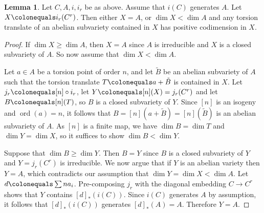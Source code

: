 \documentclass[reqno,10pt]{amsart}
\theoremstyle{definition}
\theoremstyle{definition}
\newtheorem{lem}[thm]{Lemma}
\DeclareMathOperator{\ord}{ord}
\begin{document}
\begin{lem}\label{lem:curvesinJacobians} Let $C,A,i,i_r$ be as above. Assume that $i(C)$ generates $A$. Let $X \colonequals i_r(C^r)$. Then either $X = A$, or $\dim X < \dim A$ and any torsion translate of an abelian subvariety contained in $X$ has positive codimension in $X$.
\end{lem}

\begin{proof}
If $\dim X \geq \dim A$, then $X=A$ since $A$ is irreducible and $X$ is a closed subvariety of $A$. So now assume that $\dim X < \dim A$. 

Let $a \in A$ be a torsion point of order $n$, and let $\tilde{B}$ be an abelian subvariety of $A$ such that the torsion translate $T \colonequals a+\tilde{B}$ is contained in $X$. Let $j_r \colonequals [n] \circ i_r$, let $Y \colonequals [n](X) = j_r(C^r)$ and let $B \colonequals [n](T)$, so $B$ is a closed subvariety of $Y$. Since $[n]$ is an isogeny and $\ord(a) = n$, it follows that $B = [n](a+\tilde{B}) = [n](\tilde{B})$ is an abelian subvariety of $A$. As $[n]$ is a finite map, we have $\dim B = \dim T$ and $\dim Y = \dim X$, so it suffices to show $\dim B < \dim Y$. 


Suppose that $\dim B \geq \dim Y$. Then $B=Y$ since $B$ is a closed subvariety of $Y$ and $Y = j_r(C^r)$ is irreducible. We now argue that if $Y$ is an abelian variety then $Y=A$, which contradicts our assumption that $\dim Y = \dim X < \dim A$. Let $d \colonequals \sum na_i$. Pre-composing $j_r$ with the diagonal embedding $ C \rightarrow C^r$ shows that $Y$ contains $[d]_*(i(C))$. Since $i(C)$ generates $A$ by assumption, it follows that $[d]_*(i(C))$ generates $[d]_*(A) = A$.  Therefore $Y=A$.
\end{proof}
\end{document}
